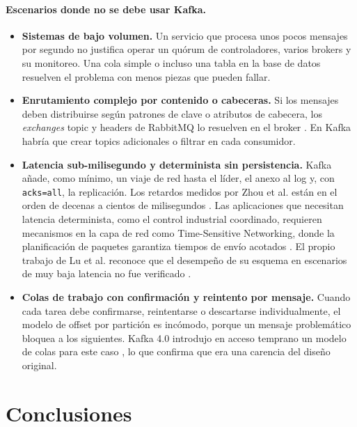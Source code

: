 \documentclass[11pt,a4paper]{article}
\begin{document}
\paragraph{Escenarios donde no se debe usar Kafka.}
\begin{itemize}
\item \textbf{Sistemas de bajo volumen.} Un servicio que procesa unos pocos mensajes por segundo no justifica operar un quórum de controladores, varios brokers y su monitoreo. Una cola simple o incluso una tabla en la base de datos resuelven el problema con menos piezas que pueden fallar.
\item \textbf{Enrutamiento complejo por contenido o cabeceras.} Si los mensajes deben distribuirse según patrones de clave o atributos de cabecera, los \emph{exchanges} topic y headers de RabbitMQ lo resuelven en el broker \cite{rabbitmqamqp}. En Kafka habría que crear topics adicionales o filtrar en cada consumidor.
\item \textbf{Latencia sub-milisegundo y determinista sin persistencia.} Kafka añade, como mínimo, un viaje de red hasta el líder, el anexo al log y, con \texttt{acks=all}, la replicación. Los retardos medidos por Zhou et al. están en el orden de decenas a cientos de milisegundos \cite{zhou2024distributed}. Las aplicaciones que necesitan latencia determinista, como el control industrial coordinado, requieren mecanismos en la capa de red como Time-Sensitive Networking, donde la planificación de paquetes garantiza tiempos de envío acotados \cite{lv2023making}. El propio trabajo de Lu et al. reconoce que el desempeño de su esquema en escenarios de muy baja latencia no fue verificado \cite{lu2025proposal}.
\item \textbf{Colas de trabajo con confirmación y reintento por mensaje.} Cuando cada tarea debe confirmarse, reintentarse o descartarse individualmente, el modelo de offset por partición es incómodo, porque un mensaje problemático bloquea a los siguientes. Kafka 4.0 introdujo en acceso temprano un modelo de colas para este caso \cite{kafka40release}, lo que confirma que era una carencia del diseño original.
\end{itemize}

\section{Conclusiones}
\end{document}
